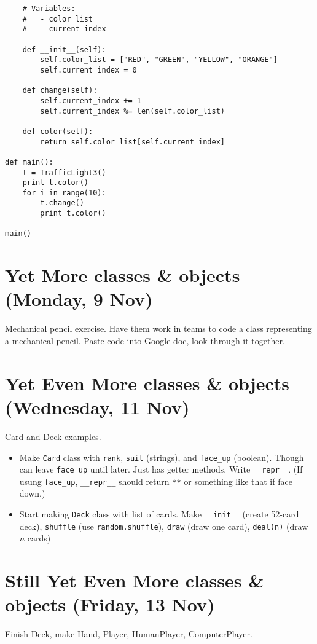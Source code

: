 \documentclass{article}
\begin{document}
\begin{verbatim}
    # Variables:
    #   - color_list
    #   - current_index

    def __init__(self):
        self.color_list = ["RED", "GREEN", "YELLOW", "ORANGE"]
        self.current_index = 0

    def change(self):
        self.current_index += 1
        self.current_index %= len(self.color_list)

    def color(self):
        return self.color_list[self.current_index]

def main():
    t = TrafficLight3()
    print t.color()
    for i in range(10):
        t.change()
        print t.color()

main()
\end{verbatim}

\section*{Yet More classes \& objects (Monday, 9 Nov)}

Mechanical pencil exercise.  Have them work in teams to code a class
representing a mechanical pencil.  Paste code into Google doc, look
through it together.

\section*{Yet Even More classes \& objects (Wednesday, 11 Nov)}

Card and Deck examples.
\begin{itemize}
\item Make \verb|Card| class with \verb|rank|, \verb|suit| (strings),
  and \verb|face_up| (boolean).  Though can leave \verb|face_up| until
  later.  Just has getter methods.  Write \verb|__repr__|. (If usung
  \verb|face_up|, \verb|__repr__| should return \verb|**| or something
  like that if face down.)
\item Start making \verb|Deck| class with list of cards.  Make
  \verb|__init__| (create 52-card deck), \verb|shuffle| (use
  \verb|random.shuffle|), \verb|draw| (draw one card), \verb|deal(n)|
  (draw $n$ cards)
\end{itemize}

\section*{Still Yet Even More classes \& objects (Friday, 13 Nov)}

Finish Deck, make Hand, Player, HumanPlayer, ComputerPlayer.
\end{document}
